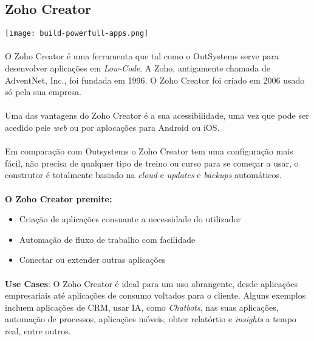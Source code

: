 \documentclass[pdflatex,sn-mathphys-num]{sn-jnl}
\theoremstyle{thmstyleone}
\theoremstyle{thmstyletwo}
\theoremstyle{thmstylethree}
\begin{document}
\newpage

\subsection{Zoho Creator\cite{bib16}}\label{subsec}
\begin{center}
\texttt{[image: build-powerfull-apps.png]}
\end{center}
\paragraph{}O Zoho Creator é uma ferramenta que tal como o OutSystems serve para desenvolver aplicações em \textit{Low-Code}. A Zoho, antigamente chamada de AdventNet, Inc., foi fundada em 1996. O Zoho Creator foi criado em 2006 usado só pela sua empresa.
\paragraph{}Uma das vantagens do Zoho Creator é a sua acessibilidade, uma vez que pode ser acedido pele \textit{web} ou por aplocações para Android ou iOS.
\paragraph{}Em comparação com Outsystems o Zoho Creator tem uma configuração mais fácil, não precisa de qualquer tipo de treino ou curso para se começar a usar, o construtor é totalmente basiado na \textit{cloud} e \textit{updates} e \textit{backups} automáticos.
\paragraph{}\textbf{O Zoho Creator premite:}
\begin{itemize}
    \item Criação de aplicações consuante a necessidade do utilizador
    \item Automação de fluxo de trabalho com facilidade
    \item Conectar ou extender outras aplicações
\end{itemize}

\newpage

\paragraph{}\textbf{Use Cases}:
\newline O Zoho Creator é ideal para um uso abrangente, desde aplicações empresariais até aplicações de consumo voltados para o cliente. Alguns exemplos incluem aplicações de CRM\cite{bib13}, usar IA, como \textit{Chatbots}, nas suas aplicações, automação de processos, aplicações móveis, obter relatórtio e \textit{insights} a tempo real, entre outros.
\end{document}
